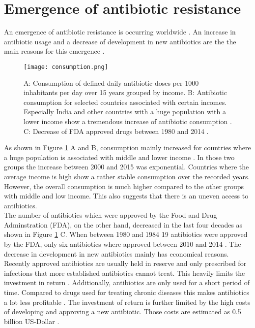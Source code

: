 \section{Emergence of antibiotic resistance}
An emergence of antibiotic resistance is occurring worldwide \cite{ventola_antibiotic_2015}. An increase in antibiotic usage and a decrease of development in new antibiotics are the the main reasons for this emergence \cite{ventola_antibiotic_2015}. 
\begin{figure}[H]
	\texttt{[image: consumption.png]}
	\caption{A: Consumption of defined daily antibiotic doses per 1000 inhabitants per day over 15 years grouped by income.  B: Antibiotic consumption for selected countries associated with certain incomes. Especially India and other countries with a huge population with a lower income show a tremendous increase of antibiotic consumption \cite{klein_global_2018}. C: Decrease of FDA approved drugs between 1980 and 2014 \cite{ventola_antibiotic_2015}.}
	\label{figure:emergence}
\end{figure}
As shown in Figure \ref{figure:emergence} A and B, consumption mainly increased for countries where a huge population is associated with middle and lower income \cite{klein_global_2018}. In those two groups the increase between 2000 and 2015 was exponential. Countries where the average income is high show a rather stable consumption over the recorded years. However, the overall consumption is much higher compared to the other groups with middle and low income. This also suggests that there is an uneven access to antibiotics. \\
The number of antibiotics which were approved by the Food and Drug  Adminstration (FDA), on the other hand, decreased in the last four decades as shown in Figure \ref{figure:emergence} C. When between 1980 and 1984 19 antibiotics were approved by the FDA, only six antibiotics where approved between 2010 and 2014 \cite{ventola_antibiotic_2015}. The decrease in development in new antibiotics mainly has economical reasons. Recently approved antibiotics are usually held in reserve and only prescribed for infections that more established antibiotics cannot treat. This heavily limits the investment in return \cite{fair_antibiotics_2014}. Additionally, antibiotics are only used for a short period of time. Compared to drugs used for treating chronic diseases this makes antibiotics a lot less profitable  \cite{fair_antibiotics_2014}. The investment of return is further limited by the high costs of developing and approving a new antibiotic. Those costs are estimated as 0.5 billion US-Dollar \cite{costs}. \\
